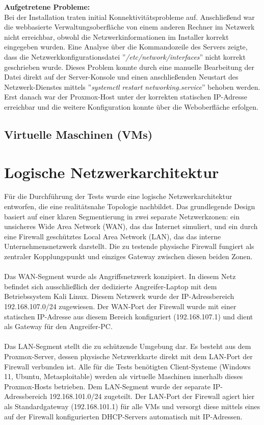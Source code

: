 \textbf{Aufgetretene Probleme:}\\
Bei der Installation  traten initial Konnektivitätsprobleme auf. Anschließend war die webbasierte Verwaltungsoberfläche von einem anderen Rechner im Netzwerk nicht erreichbar, obwohl die Netzwerkinformationen im Installer korrekt eingegeben wurden. Eine Analyse über die Kommandozeile des Servers zeigte, dass die Netzwerkkonfigurationsdatei ''\textit{/etc/network/interfaces}'' nicht korrekt geschrieben wurde. Dieses Problem konnte durch eine manuelle Bearbeitung der Datei direkt auf der Server-Konsole und einen anschließenden Neustart des Netzwerk-Dienstes mittels ''\textit{systemctl restart networking.service}'' behoben werden. Erst danach war der Proxmox-Host unter der korrekten statischen IP-Adresse erreichbar und die weitere Konfiguration konnte über die Weboberfläche erfolgen.
\subsection{Virtuelle Maschinen (VMs)}

\section{Logische Netzwerkarchitektur}

Für die Durchführung der Tests wurde eine logische Netzwerkarchitektur entworfen, die eine realitätsnahe Topologie nachbildet. Das grundlegende Design basiert auf einer klaren Segmentierung in zwei separate Netzwerkzonen: ein unsicheres Wide Area Network (WAN), das das Internet simuliert, und ein durch eine Firewall geschütztes Local Area Network (LAN), das das interne Unternehmensnetzwerk darstellt. Die zu testende physische Firewall fungiert als zentraler Kopplungspunkt und einziges Gateway zwischen diesen beiden Zonen.\\\\

Das WAN-Segment wurde als Angriffsnetzwerk konzipiert. In diesem Netz befindet sich ausschließlich der dedizierte Angreifer-Laptop mit dem Betriebssystem Kali Linux. Diesem Netzwerk wurde der IP-Adressbereich 192.168.107.0/24 zugewiesen. Der WAN-Port der Firewall wurde mit einer statischen IP-Adresse aus diesem Bereich konfiguriert (192.168.107.1) und dient als Gateway für den Angreifer-PC.\\\\

Das LAN-Segment stellt die zu schützende Umgebung dar. Es besteht aus dem Proxmox-Server, dessen physische Netzwerkkarte direkt mit dem LAN-Port der Firewall verbunden ist. Alle für die Tests benötigten Client-Systeme (Windows 11, Ubuntu, Metasploitable) werden als virtuelle Maschinen innerhalb dieses Proxmox-Hosts betrieben. Dem LAN-Segment wurde der separate IP-Adressbereich 192.168.101.0/24 zugeteilt. Der LAN-Port der Firewall agiert hier als Standardgateway (192.168.101.1) für alle VMs und versorgt diese mittels eines auf der Firewall konfigurierten DHCP-Servers automatisch mit IP-Adressen.\\\\

